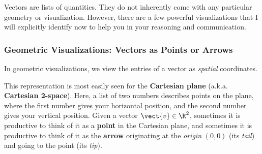 Vectors are lists of quantities.
They do not inherently come with any particular geometry or visualization.
However, there are a few powerful visualizations that I will explicitly identify now to help you in your reasoning and communication.

%


\subsubsection{Geometric Visualizations: Vectors as Points or Arrows}

\vspace{-1pc}
In geometric visualizations, we view the entries of a vector as \textit{spatial} coordinates.

This representation is most easily seen for the \textbf{Cartesian plane} (a.k.a. \textbf{Cartesian 2-space}).  
Here, a list of two numbers describes points on the plane, where the first number gives your horizontal position, and the second number gives your vertical position.
Given a vector $\vect{v}\in\R^2$, sometimes it is productive to think of it as a \textbf{point} in the Cartesian plane, and sometimes it is productive to think of it as the \textbf{arrow} originating at the \textit{origin} $(0,0)$ (its \textit{tail}) and going to the point (its \textit{tip}).

